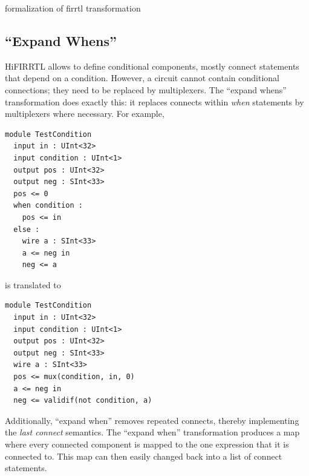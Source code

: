 
formalization of firrtl transformation

\subsection{``Expand Whens''}

HiFIRRTL allows to define conditional components,
mostly connect statements that depend on a condition.
However, a circuit cannot contain conditional connections;
they need to be replaced by multiplexers.
The ``expand whens'' transformation does exactly this:
it replaces connects within \textit{when} statements by multiplexers where necessary.
For example, \pagebreak[1]\\
\begin{minipage}[t]{12.97em}
\vspace*{-\baselineskip}
\begin{lstlisting}
module TestCondition
  input in : UInt<32>
  input condition : UInt<1>
  output pos : UInt<32>
  output neg : SInt<33>
  pos <= 0
  when condition :
    pos <= in
  else :
    wire a : SInt<33>
    a <= neg in
    neg <= a
\end{lstlisting}
\end{minipage}
is translated to\qquad{}%
\begin{minipage}[t]{16.33em}
\vspace*{-\baselineskip}
\begin{lstlisting}
module TestCondition
  input in : UInt<32>
  input condition : UInt<1>
  output pos : UInt<32>
  output neg : SInt<33>
  wire a : SInt<33>
  pos <= mux(condition, in, 0)
  a <= neg in
  neg <= validif(not condition, a)
\end{lstlisting}
\end{minipage}

Additionally, ``expand when'' removes repeated connects,
thereby implementing the \emph{last connect} semantics.
The ``expand when'' transformation produces a map
where every connected component is mapped to the one expression
that it is connected to.
This map can then easily changed back into a list of connect statements.

